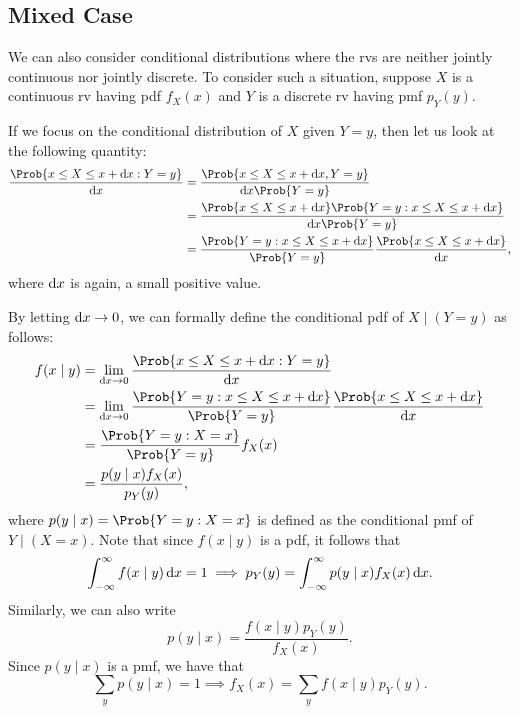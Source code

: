 \subsection*{Mixed Case}
\begin{Regular}{}
    We can also consider conditional distributions where the rvs are neither jointly continuous nor
    jointly discrete. To consider such a situation, suppose $X$ is a continuous rv having pdf $ f_X(x) $
    and $Y$ is a discrete rv having pmf $ p_Y(y) $.

    If we focus on the conditional distribution of $ X $ given $ Y=y $, then let us look at the following quantity:
    \begin{align*}
        \frac{\Prob{x\le X\le x+\odif{x}\given Y=y}}{\odif{x}}
         & =\frac{\Prob{x\le X\le x+\odif{x},Y=y}}{\odif{x}\Prob{Y=y}}                                            \\
         & = \frac{\Prob{x\le X\le x+\odif{x}}\Prob{Y=y\given x\le X\le x+\odif{x}}}{\odif{x}\Prob{Y=y}}          \\
         & =\frac{\Prob{Y=y\given x\le X\le x+\odif{x}}}{\Prob{Y=y}}\frac{\Prob{x\le X\le x+\odif{x}}}{\odif{x}},
    \end{align*}
    where $ \odif{x} $ is again, a small positive value.

    By letting $ \odif{x}\to 0 $, we can formally define the conditional pdf of $ X\mid(Y=y) $ as follows:
    \begin{align*}
        f(x\mid y)
         & =\lim\limits_{{\odif{x}} \to {0}} \frac{\Prob{x\le X\le x+\odif{x}\given Y=y}}{\odif{x}}                                               \\
         & = \lim\limits_{{\odif{x}} \to {0}}\frac{\Prob{Y=y\given x\le X\le x+\odif{x}}}{\Prob{Y=y}}\frac{\Prob{x\le X\le x+\odif{x}}}{\odif{x}} \\
         & =\frac{\Prob{Y=y\given X=x}}{\Prob{Y=y}} f_X(x)                                                                                        \\
         & =\frac{p(y\mid x)f_X(x)}{p_Y(y)},
    \end{align*}
    where $ p(y\mid x)=\Prob{Y=y\given X=x} $ is defined as the conditional pmf of $ Y\mid(X=x) $. Note that
    since $ f(x\mid y) $ is a pdf, it follows that
    \[ \int_{-\infty}^{\infty}f(x\mid y)\odif{x} =1\implies p_Y(y)=\int_{-\infty}^{\infty}p(y\mid x)f_X(x)\odif{x}. \]
    Similarly, we can also write
    \[ p(y\mid x)=\frac{f(x\mid y)p_Y(y)}{f_X(x)}. \]
    Since $ p(y\mid x) $ is a pmf, we have that
    \[ \sum_y p(y\mid x)=1\implies f_X(x)=\sum_y f(x\mid y)p_Y(y). \]
\end{Regular}
